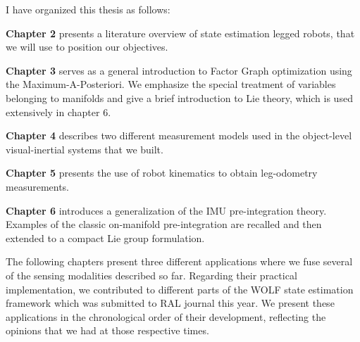 

I have organized this thesis as follows:

\bigskip
\textbf{Chapter 2} presents a literature overview of state estimation legged robots, that we will use to position our objectives.

\bigskip
\textbf{Chapter 3} serves as a general introduction to Factor Graph optimization using the Maximum-A-Posteriori. We emphasize the special treatment of variables 
belonging to manifolds and give a brief introduction to Lie theory, which is used extensively in chapter 6.

\bigskip
\textbf{Chapter 4} describes two different measurement models used in the object-level visual-inertial systems that we built. 

\bigskip
\textbf{Chapter 5} presents the use of robot kinematics to obtain leg-odometry measurements. 

\bigskip
\textbf{Chapter 6} introduces a generalization of the IMU pre-integration theory. Examples of the classic on-manifold pre-integration are recalled and 
then extended to a compact Lie group formulation. 

\bigskip
The following chapters present three different applications where we fuse several of the sensing modalities described so far.
Regarding their practical implementation, we contributed to different parts of the WOLF state estimation framework \cite{sola2021wolf} which was 
submitted to RAL journal this year. We present these applications in the chronological order of their development, reflecting the opinions that
we had at those respective times.


